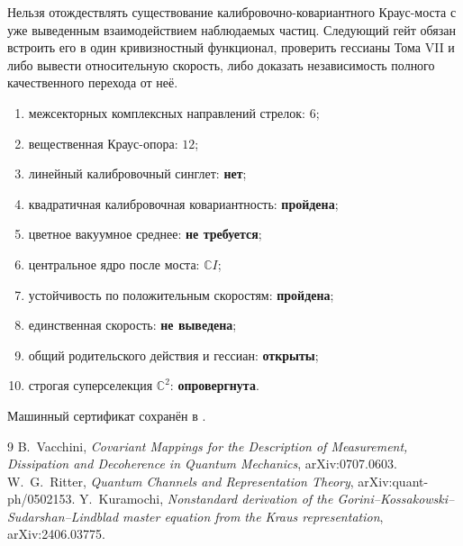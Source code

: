 \begin{nogocriterion}
Нельзя отождествлять существование калибровочно-ковариантного Краус-моста с уже
выведенным взаимодействием наблюдаемых частиц. Следующий гейт обязан
встроить его в один кривизностный функционал, проверить гессианы Тома VII и
либо вывести относительную скорость, либо доказать независимость полного
качественного перехода от неё.
\end{nogocriterion}

\begin{protocol}
\begin{enumerate}
 \item межсекторных комплексных направлений стрелок: \textbf{$6$};
 \item вещественная Краус-опора: \textbf{$12$};
 \item линейный калибровочный синглет: \textbf{нет};
 \item квадратичная калибровочная ковариантность: \textbf{пройдена};
 \item цветное вакуумное среднее: \textbf{не требуется};
 \item центральное ядро после моста: \textbf{$\mathbb CI$};
 \item устойчивость по положительным скоростям: \textbf{пройдена};
 \item единственная скорость: \textbf{не выведена};
 \item общий родительского действия и гессиан: \textbf{открыты};
 \item строгая суперселекция $\mathbb C^2$: \textbf{опровергнута}.
\end{enumerate}
\end{protocol}

Машинный сертификат сохранён в
.

\begin{thebibliography}{9}
B.~Vacchini,
\emph{Covariant Mappings for the Description of Measurement, Dissipation
and Decoherence in Quantum Mechanics}, arXiv:0707.0603.
W.~G.~Ritter,
\emph{Quantum Channels and Representation Theory},
arXiv:quant-ph/0502153.
Y.~Kuramochi,
\emph{Nonstandard derivation of the Gorini--Kossakowski--Sudarshan--Lindblad
master equation from the Kraus representation}, arXiv:2406.03775.
\end{thebibliography}